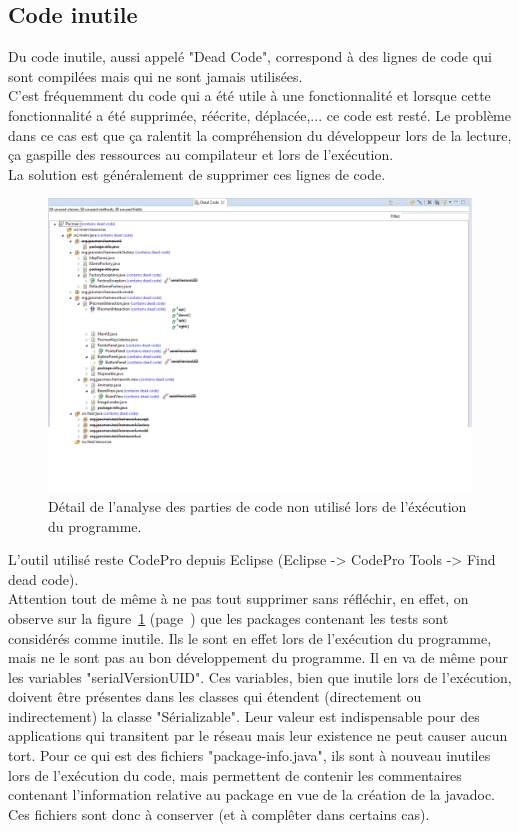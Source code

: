 \documentclass[12pt,a4paper,final]{article}
\newcommand{\labelfigure}[1]{figure~\ref{#1} (page~\pageref{#1})}
\begin{document}
\subsection{Code inutile}\label{deadCode}
Du code inutile, aussi appelé "Dead Code", correspond à des lignes de code qui sont compilées mais qui ne sont jamais utilisées.\\
C'est fréquemment du code qui a été utile à une fonctionnalité et lorsque cette fonctionnalité a été supprimée, réécrite, déplacée,... ce code est resté. Le problème dans ce cas est que ça ralentit la compréhension du développeur lors de la lecture, ça gaspille des ressources au compilateur et lors de l'exécution.\\
La solution est généralement de supprimer ces lignes de code.
\begin{figure}[!h]
	\centering
	\includegraphics[width=\textwidth]{DeadCode.png}
	\caption{\label{deadcode}Détail de l'analyse des parties de code non utilisé lors de l'éxécution du programme.}
\end{figure}
L'outil utilisé reste CodePro depuis Eclipse (Eclipse -> CodePro Tools -> Find dead code).\\
Attention tout de même à ne pas tout supprimer sans réfléchir, en effet, on observe sur la \labelfigure{deadcode} que les packages contenant les tests sont considérés comme inutile. Ils le sont en effet lors de l'exécution du programme, mais ne le sont pas au bon développement du programme. Il en va de même pour les variables "serialVersionUID". Ces variables, bien que inutile lors de l'exécution, doivent être présentes dans les classes qui étendent (directement ou indirectement) la classe "Sérializable". Leur valeur est indispensable pour des applications qui transitent par le réseau mais leur existence ne peut causer aucun tort. Pour ce qui est des fichiers "package-info.java", ils sont à nouveau inutiles lors de l'exécution du code, mais permettent de contenir les commentaires contenant l'information relative au package en vue de la création de la javadoc. Ces fichiers sont donc à conserver (et à complêter dans certains cas).\\
\end{document}
